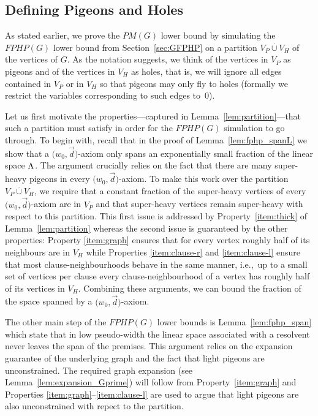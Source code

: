 \documentclass{theoretics}
\newcommand{\disjointunion}{\overset{.}{\cup}}
\newcommand{\ie}{i.e.,\ }
\newcommand{\refsec}[1]{Section~\ref{#1}}
\newcommand{\reflem}[1]{Lemma~\ref{#1}}
\newcommand{\formulaformat}[1]{\mathit{#1}}
\newcommand{\graphfphpnot}[1][G]{\formulaformat{FPHP}({#1})}
\newcommand{\sheavy}{super-heavy\xspace}
\newcommand{\light}{light\xspace}
\newcommand{\GFPHP}{G\text{-}FPHP}
\newcommand{\PM}{PM(G)}
\renewcommand{\GFPHP}{\graphfphpnot[G]}
\renewcommand{\PM}{\formulaformat{PM}(G)}
\newcommand{\V}[1][]{V_{#1}}
\newcommand{\Vp}{\V[P]}
\newcommand{\Vh}{\V[H]}
\newcommand{\vecthr}{\vec{d}}
\newcommand{\linspace}[1][]{\ensuremath \Lambda_{{#1}}}
\newcommand{\fakeaxiom}{$\bigl( w_0, \vecthr \bigr)$-axiom\xspace}
\newcommand{\pseudowidth}{pseudo-width\xspace}
\newcommand{\squeezesubsection}[1]{\subsection{#1}}
\numberwithin{equation}{section}
\begin{document}
 

\squeezesubsection{Defining Pigeons and Holes}
\label{sec:onto_random}


As stated earlier, we prove the $\PM$ lower bound by simulating the
$\GFPHP$ lower bound from \refsec{sec:GFPHP} on a partition
$\Vp \disjointunion \Vh$ of the vertices of $G$. As the notation
suggests, we think of the vertices in $\Vp$ as pigeons and of the
vertices in $\Vh$ as holes, that is, we will ignore all edges
contained in $\Vp$ or in $\Vh$ so that pigeons may only fly to holes
(formally we restrict the variables corresponding to such edges
to~$0$).

Let us first motivate the properties---captured in \reflem{lem:partition}---that  
such a partition must satisfy in order for the $\GFPHP$ simulation to
go through.
To begin with, recall that in the proof of \reflem{lem:fphp_spanL}
we show that a \fakeaxiom 
only spans an exponentially small fraction of the linear space
$\linspace$. 
The argument crucially relies on the fact that there are many \sheavy 
pigeons in every \fakeaxiom. 
To make this work over the partition $\Vp
\disjointunion \Vh$, we require that a constant fraction of the
\sheavy vertices of every
\fakeaxiom are in $\Vp$
and that \sheavy vertices remain \sheavy with
respect to this partition.
This first issue is addressed by Property~\ref{item:thick} of \reflem{lem:partition}
whereas the second issue is guaranteed by the other properties:
Property \ref{item:graph} ensures that for every vertex
roughly half of its neighbours are in $\Vh$ while Properties \ref{item:clause-r}
and \ref{item:clause-l} ensure that most clause-neighbourhoods behave
in the same manner, \ie up to a small set of vertices per clause
every clause-neighbourhood of a vertex has roughly half of its vertices in $\Vh$.
Combining these arguments, we can bound the fraction of the space spanned by a
\fakeaxiom.

The other main step of the $\GFPHP$ lower bounds is
\reflem{lem:fphp_span} which state that in low \pseudowidth the linear
space associated with a resolvent never leaves the span of the
premises.  This argument relies on the expansion guarantee of the
underlying graph and the fact that \light pigeons are unconstrained.
The required graph expansion (see \reflem{lem:expansion_Gprime}) 
will follow from 
Property~\ref{item:graph} and Properties
\ref{item:graph}--\ref{item:clause-l} are used to argue that
\light pigeons are also unconstrained with repect to the
partition.
\end{document}
